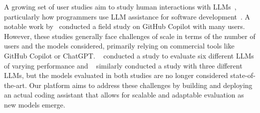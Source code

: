 A growing set of user studies aim to study human interactions with LLMs~\citep{lee2023evaluating}, particularly how programmers use LLM assistance for software development~\citep{barke2022grounded, vaithilingam2022expectation,ross2023programmer,peng2023impact,mozannar2022reading,murali2024ai,chen2024need}.
A notable work by~\citet{cui2024productivity} conducted a field study on GitHub Copilot with many users. 
However, these studies generally face challenges of scale in terms of the number of users and the models considered, primarily relying on commercial tools like GitHub Copilot or ChatGPT.
~\citet{mozannar2024realhumaneval} conducted a study to evaluate six different LLMs of varying performance and ~\citet{izadi2024languagemodelscodecompletion} similarly conducted a study with three different LLMs, but the models evaluated in both studies are no longer considered state-of-the-art.
Our platform aims to address these challenges by building and deploying an actual coding assistant that allows for scalable and adaptable evaluation as new models emerge.












